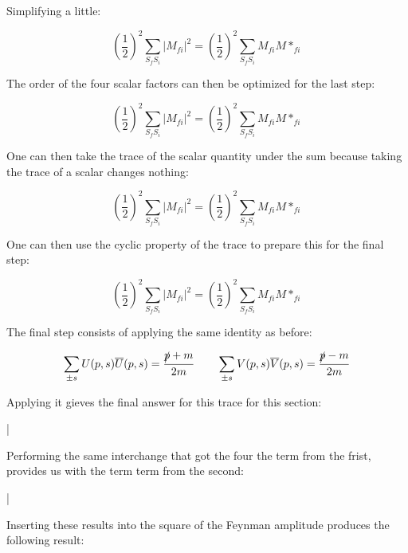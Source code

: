 \documentclass[a4]{article}
\begin{document}
    Simplifying a little:

    \begin{equation}
        (\frac{1}{2})^2 \sum_{S_f S_i} |M_{f i}|^2 = (\frac{1}{2})^2 \sum_{S_f S_i} M_{fi} M*_{fi}
    \end{equation}

    The order of the four scalar factors can then be optimized for the last step:

    \begin{equation}
        (\frac{1}{2})^2 \sum_{S_f S_i} |M_{f i}|^2 = (\frac{1}{2})^2 \sum_{S_f S_i} M_{fi} M*_{fi}
    \end{equation}

    One can then take the trace of the scalar quantity under the sum because taking the trace of a scalar changes nothing:

    \begin{equation}
        (\frac{1}{2})^2 \sum_{S_f S_i} |M_{f i}|^2 = (\frac{1}{2})^2 \sum_{S_f S_i} M_{fi} M*_{fi}
    \end{equation}

    One can then use the cyclic property of the trace to prepare this for the final step:

    \begin{equation}
        (\frac{1}{2})^2 \sum_{S_f S_i} |M_{f i}|^2 = (\frac{1}{2})^2 \sum_{S_f S_i} M_{fi} M*_{fi}
    \end{equation}

    The final step consists of applying the same identity as before:

    \begin{equation}
        \sum_{\pm s} U (p, s) \overline{U} (p, s) = \frac{\slashed{p} + m}{2m} \qquad \sum_{\pm s} V (p, s) \overline{V} (p, s) = \frac{\slashed{p} - m}{2m}
    \end{equation}

    Applying it gieves the final answer for this trace for this section:

    \begin{framed}
        |
    \end{framed}

    Performing the same interchange that got the four the term from the frist, provides us with the term term from the second:

    \begin{framed}
        |
    \end{framed}

    Inserting these results into the square of the Feynman amplitude produces the following result:
\end{document}
